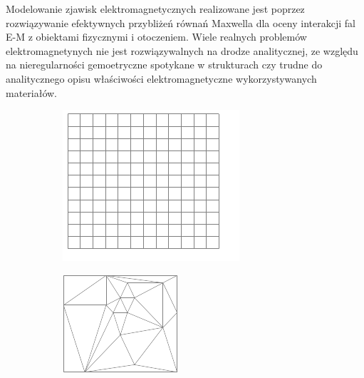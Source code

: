 Modelowanie zjawisk elektromagnetycznych realizowane jest poprzez rozwiązywanie efektywnych przybliżeń równań Maxwella dla oceny interakcji fal E-M z obiektami fizycznymi i otoczeniem. Wiele realnych problemów elektromagnetynych nie jest rozwiązywalnych na drodze analitycznej, ze względu na nieregularności gemoetryczne spotykane w strukturach czy trudne do analitycznego opisu właściwości elektromagnetyczne wykorzystywanych materiałów.


\begin{figure}[tb]
	\centering
	\begin{subfigure}{0.45\textwidth}
		\includegraphics[width=\textwidth]{images/wstep/fdtd.png}
		\caption{}
		\label{fig:wstep-fdtd-dic}
	\end{subfigure}
	\begin{subfigure}{0.45\textwidth}
		\includegraphics[width=\textwidth]{images/wstep/fem.png}
		\caption{}
		\label{fig:wstep-fem-dic}
		

\end{subfigure}
\end{figure}
